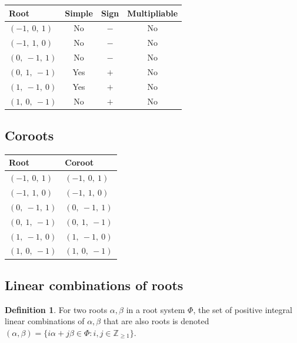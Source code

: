 \documentclass[11pt]{article}
\theoremstyle{definition}
\newtheorem{definition}{Definition}[section]
\begin{document}
\begin{tabular}{|l|c|c|c|}
    \hline
    \textbf{Root} & \textbf{Simple} & \textbf{Sign} & \textbf{Multipliable} \\
    \hline
    $\left( -1, \  0, \  1\right)$ & No & $-$ & No \\
    \hline
    $\left( -1, \  1, \  0\right)$ & No & $-$ & No \\
    \hline
    $\left( 0, \  -1, \  1\right)$ & No & $-$ & No \\
    \hline
    $\left( 0, \  1, \  -1\right)$ & Yes & $+$ & No \\
    \hline
    $\left( 1, \  -1, \  0\right)$ & Yes & $+$ & No \\
    \hline
    $\left( 1, \  0, \  -1\right)$ & No & $+$ & No \\
    \hline
\end{tabular}


\subsection{Coroots}

\begin{tabular}{|l|l|}
    \hline
    \textbf{Root} & \textbf{Coroot} \\
    \hline
    $\left( -1, \  0, \  1\right)$ & $\left( -1, \  0, \  1\right)$ \\
    \hline
    $\left( -1, \  1, \  0\right)$ & $\left( -1, \  1, \  0\right)$ \\
    \hline
    $\left( 0, \  -1, \  1\right)$ & $\left( 0, \  -1, \  1\right)$ \\
    \hline
    $\left( 0, \  1, \  -1\right)$ & $\left( 0, \  1, \  -1\right)$ \\
    \hline
    $\left( 1, \  -1, \  0\right)$ & $\left( 1, \  -1, \  0\right)$ \\
    \hline
    $\left( 1, \  0, \  -1\right)$ & $\left( 1, \  0, \  -1\right)$ \\
    \hline
\end{tabular}


\subsection{Linear combinations of roots}

\begin{definition}
For two roots $\alpha, \beta$ in a root system $\Phi$, the set of positive integral linear combinations of $\alpha, \beta$ that are also roots is denoted
\(
	(\alpha, \beta) = \{ i \alpha + j \beta \in \Phi : i, j \in \mathbb{Z}_{\ge 1} \}
\).
\end{definition}
\end{document}
